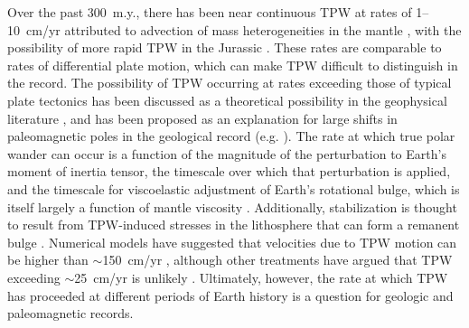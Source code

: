 Over the past 300~m.y., there has been near continuous TPW at rates of 1--10~cm/yr attributed to advection of mass heterogeneities in the mantle \citep{Steinberger2008a, Torsvik2012a}, with the possibility of more rapid TPW in the Jurassic \citep{Kent2015a}. These rates are comparable to rates of differential plate motion, which can make TPW difficult to distinguish in the record. The possibility of TPW occurring at rates exceeding those of typical plate tectonics has been discussed as a theoretical possibility in the geophysical literature \citep{Gold1955a, Fisher1974a, Steinberger1997a, Evans2003a}, and has been proposed as an explanation for large shifts in paleomagnetic poles in the geological record (e.g. \citealp{Kirschvink1997a}). The rate at which true polar wander can occur is a function of the magnitude of the perturbation to Earth's moment of inertia tensor, the timescale over which that perturbation is applied, and the timescale for viscoelastic adjustment of Earth's rotational bulge, which is itself largely a function of mantle viscosity \citep{Tsai2007a, Steinberger2010a, Creveling2012a}. Additionally, stabilization is thought to result from TPW-induced stresses in the lithosphere that can form a remanent bulge \citep{Ricard1993a, Chan2014a}. Numerical models have suggested that velocities due to TPW motion can be higher than $\sim$150~cm/yr \citep{Spada1992a}, although other treatments have argued that TPW exceeding $\sim$25~cm/yr is unlikely \citep{Tsai2007a}. Ultimately, however, the rate at which TPW has proceeded at different periods of Earth history is a question for geologic and paleomagnetic records.


